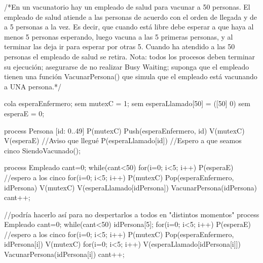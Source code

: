 /*En un vacunatorio hay
un empleado de salud para vacunar a
50 personas. El empleado
de salud atiende a las personas de acuerdo con el orden de llegada y de a 5 personas a la
vez. Es decir, que cuando está libre debe esperar a que haya al menos 5 personas
esperando, luego vacuna a las 5 primeras personas, y al terminar las deja ir para esperar
por otras 5. Cuando ha atendido a las 50 personas el empleado de salud se retira.
Nota:
todos los procesos deben terminar su ejecución; asegurarse de no realizar Busy Waiting;
suponga que el empleado tienen una función VacunarPersona() que simula que el empleado
está vacunando a UNA persona.*/

cola esperaEnfermero;
sem mutexC = 1;
sem esperaLlamado[50] = ([50] 0)
sem esperaE = 0;

process Persona [id: 0..49]
{
    P(mutexC)
    Push(esperaEnfermero, id)
    V(mutexC)
    V(esperaE) //Aviso que llegué
    P(esperaLlamado[id]) //Espero a que seamos cinco
    SiendoVacunado();
}

process Empleado
{
    cant=0;
    while(cant<50)
    {
        for(i=0; i<5; i++) P(esperaE) //espero a los cinco
        for(i=0; i<5; i++)
        {
            P(mutexC)
            Pop(esperaEnfermero, idPersona)
            V(mutexC)
            V(esperaLlamado[idPersona])
            VacunarPersona(idPersona)
            cant++;
        }
    }
}


//podría hacerlo así para no despertarlos a todos en "distintos momentos"
process Empleado
{
    cant=0;
    while(cant<50)
    {
        idPersona[5];
        for(i=0; i<5; i++) P(esperaE) //espero a los cinco
        for(i=0; i<5; i++)
        {
            P(mutexC)
            Pop(esperaEnfermero, idPersona[i])
            V(mutexC)
        }
        for(i=0; i<5; i++){
            V(esperaLlamado[idPersona[i]])
            VacunarPersona(idPersona[i])
            cant++;
        }
    }
}